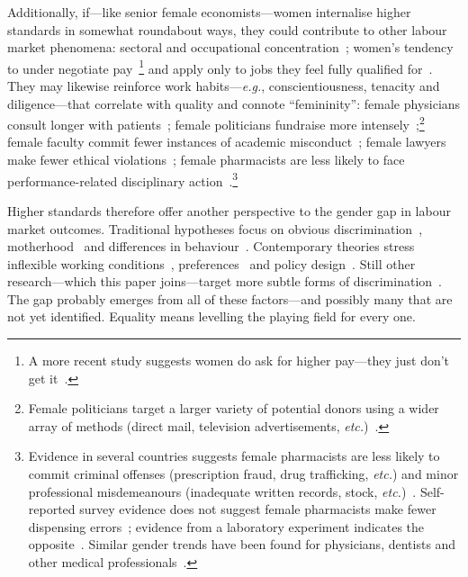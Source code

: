 Additionally, if---like senior female economists---women internalise higher standards in somewhat roundabout ways, they could contribute to other labour market phenomena: sectoral and occupational concentration~\citep{Blau2016,Cortes2016,Pertold-Gebicka2016}; women's tendency to under negotiate pay~\citep{Babcock2003}\footnote{A more recent study suggests women do ask for higher pay---they just don't get it~\citep{Artz2016}.} and apply only to jobs they feel fully qualified for~\citep{Mohr2014}. They may likewise reinforce work habits---\emph{e.g.}, conscientiousness, tenacity and diligence---that correlate with quality and connote ``femininity'': female physicians consult longer with patients~\citep{Roter2004}; female politicians fundraise more intensely~\citep{Jenkins2007};\footnote{Female politicians target a larger variety of potential donors using a wider array of methods (direct mail, television advertisements, \emph{etc.})~\citep{Jenkins2007}.} female faculty commit fewer instances of academic misconduct~\citep{Fang2013}; female lawyers make fewer ethical violations~\citep{Hatamyar2004}; female pharmacists are less likely to face performance-related disciplinary action~\citep{Schafheutle2011}.\footnote{Evidence in several countries suggests female pharmacists are less likely to commit criminal offenses (prescription fraud, drug trafficking, \emph{etc.}) and minor professional misdemeanours (inadequate written records, stock, \emph{etc.})~\citep{Tullett2003,Payne1997}. Self-reported survey evidence does not suggest female pharmacists make fewer dispensing errors~\citep{Szeinbach2007}; evidence from a laboratory experiment indicates the opposite~\citep{Family2013}. Similar gender trends have been found for physicians, dentists and other medical professionals~\citep[for a review of studies and discussion, see][]{Firth-Cozens2008}.}

Higher standards therefore offer another perspective to the gender gap in labour market outcomes. Traditional hypotheses focus on obvious discrimination~\citep{Goldin2000}, motherhood~\citep{Bertrand2010} and differences in behaviour~\citep[\emph{e.g.},][]{Niederle2010}. Contemporary theories stress inflexible working conditions~\citep{Goldin2014,Goldin2016}, preferences~\citep[for a review, see, \emph{e.g.},][]{Blau2016} and policy design~\citep{Antecol2016}. Still other research---which this paper joins---target more subtle forms of discrimination~\citep[\emph{e.g.},][]{Sarsons2017,Wu2017}. The gap probably emerges from all of these factors---and possibly many that are not yet identified. Equality means levelling the playing field for every one.

